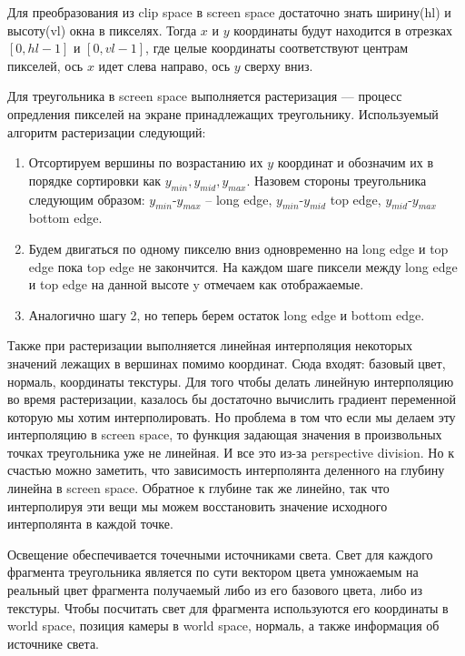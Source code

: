 \documentclass{article}
\begin{document}
Для преобразования из clip space в screen space достаточно 
знать ширину(hl) и высоту(vl) окна в пикселях.
Тогда $x$ и $y$ координаты будут находится в отрезках $[0, hl - 1]$ и $[0, vl - 1]$, 
где целые координаты соответствуют центрам пикселей, ось 
$x$ идет слева направо, ось $y$ сверху вниз.

Для треугольника в screen space выполняется растеризация ---
процесс опредления пикселей на экране принадлежащих треугольнику.
Используемый алгоритм растеризации следующий:

\begin{enumerate}
    \item Отсортируем вершины по возрастанию их $y$ координат и обозначим 
    их в порядке сортировки как $y_{min}, y_{mid}, y_{max}$. Назовем 
    стороны треугольника следующим образом: $y_{min}$-$y_{max}$ -- long edge, 
    $y_{min}$-$y_{mid}$ top edge, $y_{mid}$-$y_{max}$ bottom edge.
    \item Будем двигаться по одному пикселю вниз одновременно на long edge и 
    top edge пока top edge не закончится. На каждом шаге пиксели между long 
    edge и top edge на данной высоте y отмечаем как отображаемые.
    \item Аналогично шагу 2, но теперь берем остаток long edge и bottom edge.
\end{enumerate}

Также при растеризации выполняется линейная интерполяция некоторых значений 
лежащих в вершинах помимо координат. Сюда входят: базовый цвет, нормаль, 
координаты текстуры. Для того чтобы делать 
линейную интерполяцию во время растеризации, казалось бы достаточно вычислить градиент переменной 
которую мы хотим интерполировать. Но проблема в том что если мы делаем эту интерполяцию в 
screen space, то функция задающая значения в произвольных точках треугольника уже 
не линейная. И все это из-за perspective division. Но к счастью можно заметить, что 
зависимость интерполянта деленного на глубину линейна в screen space. Обратное к глубине 
так же линейно, так что интерполируя эти вещи мы можем восстановить значение исходного 
интерполянта в каждой точке.

Освещение обеспечивается точечными источниками света. Свет для 
каждого фрагмента треугольника является по сути вектором цвета умножаемым 
на реальный цвет фрагмента получаемый либо из его базового цвета, либо из 
текстуры. Чтобы посчитать свет для фрагмента используются его координаты в 
world space, позиция камеры в world space, нормаль, а также информация об источнике 
света.  
\end{document}
